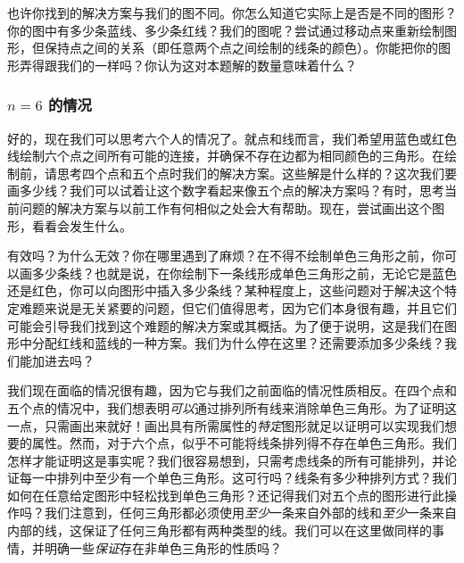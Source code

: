 也许你找到的解决方案与我们的图不同。你怎么知道它实际上是否是不同的图形？你的图中有多少条蓝线、多少条红线？我们的图呢？尝试通过移动点来重新绘制图形，但保持点之间的关系（即任意两个点之间绘制的线条的颜色）。你能把你的图形弄得跟我们的一样吗？你认为这对本题解的数量意味着什么？

\subsubsection*{$n=6$ 的情况}

好的，现在我们可以思考六个人的情况了。就点和线而言，我们希望用蓝色或红色线绘制六个点之间所有可能的连接，并确保不存在边都为相同颜色的三角形。在绘制前，请思考四个点和五个点时我们的解决方案。这些解是什么样的？这次我们要画多少线？我们可以试着让这个数字看起来像五个点的解决方案吗？有时，思考当前问题的解决方案与以前工作有何相似之处会大有帮助。现在，尝试画出这个图形，看看会发生什么。

有效吗？为什么无效？你在哪里遇到了麻烦？在不得不绘制单色三角形之前，你可以画多少条线？也就是说，在你绘制下一条线形成单色三角形之前，无论它是蓝色还是红色，你可以向图形中插入多少条线？某种程度上，这些问题对于解决这个特定难题来说是无关紧要的问题，但它们值得思考，因为它们本身很有趣，并且它们可能会引导我们找到这个难题的解决方案或其概括。为了便于说明，这是我们在图形中分配红线和蓝线的一种方案。我们为什么停在这里？还需要添加多少条线？我们能加进去吗？

\begin{center}
\end{center}

我们现在面临的情况很有趣，因为它与我们之前面临的情况性质相反。在四个点和五个点的情况中，我们想表明\emph{可以}通过排列所有线来消除单色三角形。为了证明这一点，只需画出来就好！画出具有所需属性的\emph{特定}图形就足以证明可以实现我们想要的属性。然而，对于六个点，似乎不可能将线条排列得不存在单色三角形。我们怎样才能证明这是事实呢？我们很容易想到，只需考虑线条的所有可能排列，并论证每一中排列中至少有一个单色三角形。这可行吗？线条有多少种排列方式？我们如何在任意给定图形中轻松找到单色三角形？还记得我们对五个点的图形进行此操作吗？我们注意到，任何三角形都必须使用\emph{至少}一条来自外部的线和\emph{至少}一条来自内部的线，这保证了任何三角形都有两种类型的线。我们可以在这里做同样的事情，并明确一些\emph{保证}存在非单色三角形的性质吗？

